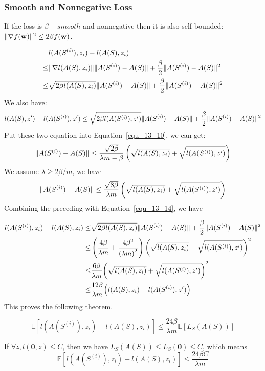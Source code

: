 \subsubsection{Smooth and Nonnegative Loss}

If the loss is $ \beta-smooth $ and nonnegative then it is also self-bounded:
$ \Arrowvert \nabla f(\mathbf{w}) \Arrowvert^2 \le 2 \beta f(\mathbf{w}) $.

\begin{equation}
	\label{equ_13_14}
	\begin{aligned}
		& l( A(S^{(i)}), z_i) - l( A(S), z_i) \\
		\le & \Arrowvert \nabla l ( A(S), z_i) \Arrowvert \Arrowvert A(S^{(i)}) - A(S) \Arrowvert
		+ \frac{\beta}{2} \Arrowvert A(S^{(i)}) - A(S) \Arrowvert^2 \\
		\le & \sqrt{2\beta l(A(S), z_i)} \Arrowvert A(S^{(i)}) - A(S) \Arrowvert
		+ \frac{\beta}{2} \Arrowvert A(S^{(i)}) - A(S) \Arrowvert^2
	\end{aligned}
\end{equation}
We also have:
\begin{equation}
	l( A(S), z') - l( A(S^{(i)}), z')
	\le \sqrt{2\beta l( A( S^{(i)} ), z')}	\Arrowvert A(S^{(i)}) - A(S) \Arrowvert
	+\frac{\beta}{2} \Arrowvert A(S^{(i)}) - A(S) \Arrowvert^2
\end{equation}
Put these two equation into Equation~\ref{equ_13_10}, we can get:
\[ 
	\Arrowvert A(S^{(i)}) - A(S) \Arrowvert \le
	\frac{\sqrt{2\beta}}{\lambda m - \beta}
	\left( \sqrt{l(A(S), z_i)} + \sqrt{l(A(S^{(i)}), z')}\right)
\]
We assume $ \lambda \ge 2\beta/m $, we have
\[ 
	\Arrowvert A(S^{(i)}) - A(S) \Arrowvert \le
	\frac{\sqrt{8\beta}}{\lambda m}
	\left( \sqrt{l(A(S), z_i)} + \sqrt{l(A(S^{(i)}), z')}\right)
\]
Combining the preceding with Equation~\ref{equ_13_14}, we have

\begin{equation}
	\begin{aligned}
		l(A(S^{(i)}), z_i) - l(A(S), z_i)
		\le & \sqrt{2\beta l(A(S), z_i)} \Arrowvert A(S^{(i)}) - A(S) \Arrowvert 
		+ \frac{\beta}{2} \Arrowvert A(S^{(i)}) - A(S) \Arrowvert^2 \\
		\le & \left( \frac{4\beta}{\lambda m} + \frac{4\beta^2}{{(\lambda m)}^2} \right)
		{\left( \sqrt{l(A(S), z_i)} + \sqrt{l(A(S^{(i)}), z')} \right)}^2 \\
		\le & \frac{6\beta}{\lambda m}
		{\left( \sqrt{l(A(S), z_i)} + \sqrt{l(A(S^{(i)}), z')} \right)}^2 \\
		\le & \frac{12\beta}{\lambda m}
		{\left( {l(A(S), z_i)} + {l(A(S^{(i)}), z')} \right)}
	\end{aligned}
\end{equation}
This proves the following theorem.
\begin{thm}
	\begin{equation}
		\mathbb{E} [l(A(S^{(i)}), z_i) - l(A(S), z_i)] \le
		\frac{24\beta}{\lambda m} \mathbb{E}[L_S(A(S))]
	\end{equation}
\end{thm}
If $\forall z, l(\mathbf{0}, z) \le C $, then we have
$ L_S(A(S)) \le  L_S(\mathbf{0}) \le C $, which means
\[ 
	\mathbb{E} [l(A(S^{(i)}), z_i) - l(A(S), z_i)] \le \frac{24\beta C}{\lambda m}
\]

